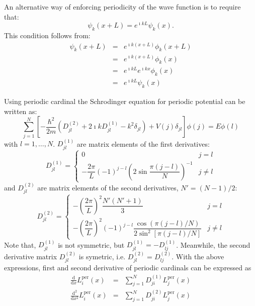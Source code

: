 An alternative way of enforcing periodicity of the wave function is
to require that:
\begin{equation}
\psi_{k}(x+L)=e^{\imath kL}\psi_{k}(x).
\end{equation}
This condition follows from:
\begin{eqnarray*}
\psi_{k}(x+L) & = & e^{\imath k(x+L)}\phi_{k}(x+L)\\
 & = & e^{\imath k(x+L)}\phi_{k}(x)\\
 & = & e^{\imath kL}e^{\imath kx}\phi_{k}(x)\\
 & = & e^{\imath kL}\psi_{k}(x)
\end{eqnarray*}


Using periodic cardinal the Schrodinger equation for periodic potential
can be written as:
\begin{equation}
\sum_{j=1}^{N}\left[-\frac{\hbar^{2}}{2m}\left(D_{jl}^{(2)}+2\imath kD_{jl}^{(1)}-k^{2}\delta_{jl}\right)+V(j)\delta_{jl}\right]\phi(j)=E\phi(l)
\end{equation}
with $l=1,\ldots,N$. $D_{jl}^{(1)}$ are matrix elements of the first
derivatives:
\begin{equation}
D_{jl}^{(1)}=\begin{cases}
0 & j=l\\
-\dfrac{2\pi}{L}(-1)^{j-l}\left(2\sin\dfrac{\pi(j-l)}{N}\right)^{-1} & j\neq l
\end{cases}
\end{equation}
and $D_{jl}^{(2)}$ are matrix elements of the second derivatives,
$N'=(N-1)/2$:
\begin{equation}
D_{jl}^{(2)}=\begin{cases}
-\left(\dfrac{2\pi}{L}\right)^{2}\dfrac{N'(N'+1)}{3} & j=l\\
-\left(\dfrac{2\pi}{L}\right)^{2}(-1)^{j-l}\dfrac{\cos\left(\pi(j-l)/N\right)}{2\sin^{2}\left[\pi(j-l)/N\right]} & j\neq l
\end{cases}
\end{equation}
Note that, $D_{jl}^{(1)}$ is not symmetric, but $D_{jl}^{(1)}=-D_{lj}^{(1)}$.
Meanwhile, the second derivative matrix $D_{jl}^{(2)}$ is symetric,
i.e. $D_{jl}^{(2)}=D_{lj}^{(2)}$. With the above expressions, first
and second derivative of periodic cardinals can be expressed as
\begin{eqnarray}
\frac{\mathrm{d}}{\mathrm{d}x}L_{i}^{\mathrm{per}}(x) & = & \sum_{j=1}^{N}D_{ji}^{(1)}L_{j}^{\mathrm{per}}(x)\\
\frac{\mathrm{d}^{2}}{\mathrm{d}x^{2}}L_{i}^{\mathrm{per}}(x) & = & \sum_{j=1}^{N}D_{ji}^{(2)}L_{j}^{\mathrm{per}}(x)
\end{eqnarray}


